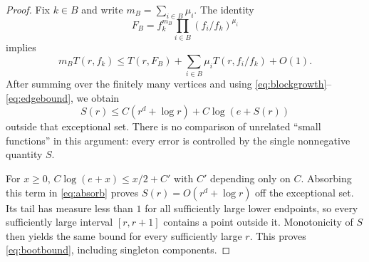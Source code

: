 \documentclass[11pt]{article}
\numberwithin{equation}{section}
\theoremstyle{definition}\newtheorem{definition}[theorem]{Definition}
\theoremstyle{remark}\newtheorem{remark}[theorem]{Remark}
\begin{document}
\begin{proof}
Fix $k\in B$ and write $m_B=\sum_{i\in B}\mu_i$. The identity
\[
 F_B=f_k^{m_B}\prod_{i\in B}(f_i/f_k)^{\mu_i}
\]
implies
\[
 m_BT(r,f_k)\leq T(r,F_B)+\sum_{i\in B}\mu_iT(r,f_i/f_k)+O(1).
\]
After summing over the finitely many vertices and using
\eqref{eq:blockgrowth}--\eqref{eq:edgebound}, we obtain
\begin{equation}\label{eq:absorb}
 S(r)\leq C(r^d+\log r)+C\log(e+S(r))
\end{equation}
outside that exceptional set. There is no comparison of unrelated
``small functions'' in this argument: every error is controlled by the
single nonnegative quantity $S$.

For $x\geq0$, $C\log(e+x)\leq x/2+C'$ with $C'$ depending only on $C$.
Absorbing this term in \eqref{eq:absorb} proves
$S(r)=O(r^d+\log r)$ off the exceptional set. Its tail has measure less
than $1$ for all sufficiently large lower endpoints, so every sufficiently
large interval $[r,r+1]$ contains a point outside it. Monotonicity of $S$
then yields the same bound for every sufficiently large $r$.
This proves \eqref{eq:bootbound}, including singleton components.
\end{proof}
\end{document}
